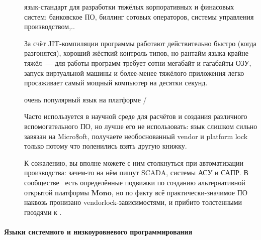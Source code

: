 \begin{description}
\item[\java]

    язык-стандарт для разработки тяжёлых корпоративных и финасовых систем:
    банковское ПО, биллинг сотовых операторов, системы управления
    производством,..

    За счёт JIT-компиляции программы работают действительно быстро (когда
    разгонятся), хороший жёсткий контроль типов, но рантайм языка крайне тяжёл\
    --- для работы программ требует сотни мегабайт и гагабайты ОЗУ, запуск
    виртуальной машины и более-менее тяжёлого приложения легко просаживает самый
    мощный компьютер на десятки секунд.

\item[\cs]

    очень популярный язык на платформе \win/\net
    
    Часто используется в научной среде для расчётов и создания различного
    вспомогательного ПО, но лучше его не использовать: язык слишком сильно
    завязан на Micro\$oft, получаете необоснованный vendor и platform lock
    только потому что поленились взять другую книжку.

    К сожалению, вы вполне можете с ним столкнуться при автоматизации
    производства: зачем-то на нём пишут SCADA, системы АСУ и САПР. В сообществе
    \os\ есть определённые подвижки по созданию альтернативной открытой
    платформы $\mathbf{Mono}$, но по факту всё практически-значимое ПО наквозь
    пронизано vendorlock-зависи\-мо\-стя\-ми, и прибито толстенными гвоздями к
    \win.
\end{description}

\paragraph{Языки системного и низкоуровневого программирования}

